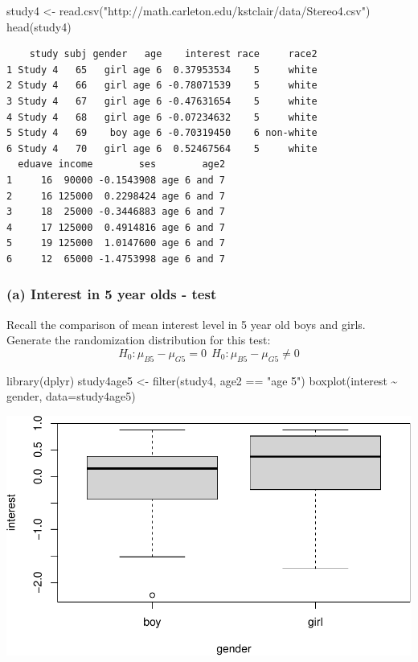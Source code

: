 \documentclass[
]{book}
\newenvironment{Shaded}{\begin{snugshade}}{\end{snugshade}}
\newcommand{\AttributeTok}[1]{\textcolor[rgb]{0.77,0.63,0.00}{#1}}
\newcommand{\FunctionTok}[1]{\textcolor[rgb]{0.00,0.00,0.00}{#1}}
\newcommand{\NormalTok}[1]{#1}
\newcommand{\OtherTok}[1]{\textcolor[rgb]{0.56,0.35,0.01}{#1}}
\newcommand{\SpecialCharTok}[1]{\textcolor[rgb]{0.00,0.00,0.00}{#1}}
\newcommand{\StringTok}[1]{\textcolor[rgb]{0.31,0.60,0.02}{#1}}
\begin{document}
\begin{Shaded}
\begin{Highlighting}[]
\NormalTok{study4 }\OtherTok{\textless{}{-}} \FunctionTok{read.csv}\NormalTok{(}\StringTok{"http://math.carleton.edu/kstclair/data/Stereo4.csv"}\NormalTok{)}
\FunctionTok{head}\NormalTok{(study4)}
\end{Highlighting}
\end{Shaded}

\begin{verbatim}
    study subj gender   age    interest race     race2
1 Study 4   65   girl age 6  0.37953534    5     white
2 Study 4   66   girl age 6 -0.78071539    5     white
3 Study 4   67   girl age 6 -0.47631654    5     white
4 Study 4   68   girl age 6 -0.07234632    5     white
5 Study 4   69    boy age 6 -0.70319450    6 non-white
6 Study 4   70   girl age 6  0.52467564    5     white
  eduave income        ses        age2
1     16  90000 -0.1543908 age 6 and 7
2     16 125000  0.2298424 age 6 and 7
3     18  25000 -0.3446883 age 6 and 7
4     17 125000  0.4914816 age 6 and 7
5     19 125000  1.0147600 age 6 and 7
6     12  65000 -1.4753998 age 6 and 7
\end{verbatim}

\hypertarget{a-interest-in-5-year-olds---test}{%
\subsubsection{(a) Interest in 5 year olds - test}\label{a-interest-in-5-year-olds---test}}

Recall the comparison of mean interest level in 5 year old boys and girls. Generate the randomization distribution for this test:
\[
H_0: \mu_{B5} - \mu_{G5} = 0 \ \ H_0: \mu_{B5} - \mu_{G5} \neq 0
\]

\begin{Shaded}
\begin{Highlighting}[]
\FunctionTok{library}\NormalTok{(dplyr)}
\NormalTok{study4age5 }\OtherTok{\textless{}{-}} \FunctionTok{filter}\NormalTok{(study4, age2 }\SpecialCharTok{==} \StringTok{"age 5"}\NormalTok{)}
\FunctionTok{boxplot}\NormalTok{(interest }\SpecialCharTok{\textasciitilde{}}\NormalTok{ gender, }\AttributeTok{data=}\NormalTok{study4age5)}
\end{Highlighting}
\end{Shaded}

\includegraphics[width=1\linewidth]{Class_Activity_14_files/figure-latex/unnamed-chunk-2-1}
\end{document}
